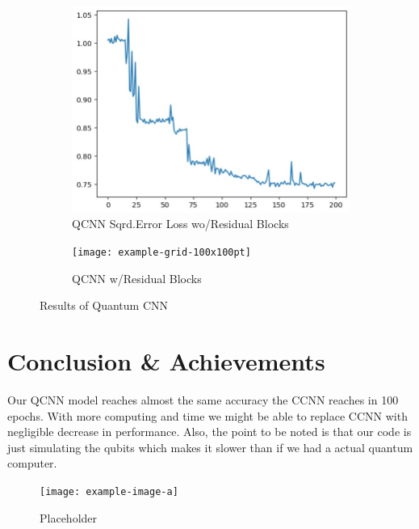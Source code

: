 \documentclass[a4paper]{article}
\begin{document}
\begin{figure}[h]
\centering
\begin{subfigure}{.5\textwidth}
  \centering
  \includegraphics[height=0.7\linewidth]{assets/qcnn.jpeg}
  \caption{QCNN Sqrd.Error Loss wo/Residual Blocks}
  \label{fig:sub3}
\end{subfigure}%
\begin{subfigure}{.5\textwidth}
  \centering
  \texttt{[image: example-grid-100x100pt]}
  \caption{QCNN w/Residual Blocks}
  \label{fig:sub2}
\end{subfigure}%
\caption{Results of Quantum CNN}
\label{fig:test}
\end{figure}%
\section*{Conclusion \& Achievements}

Our QCNN model reaches almost the same accuracy the CCNN reaches in 100 epochs. With more computing and time we might be able to replace CCNN with negligible decrease in performance. Also, the point to be noted is that our code is just simulating the qubits which makes it slower than if we had a actual quantum computer.\\

\begin{figure}[h]
\begin{center}
\texttt{[image: example-image-a]}
\end{center}
\caption{Placeholder}
\end{figure}
\end{document}
